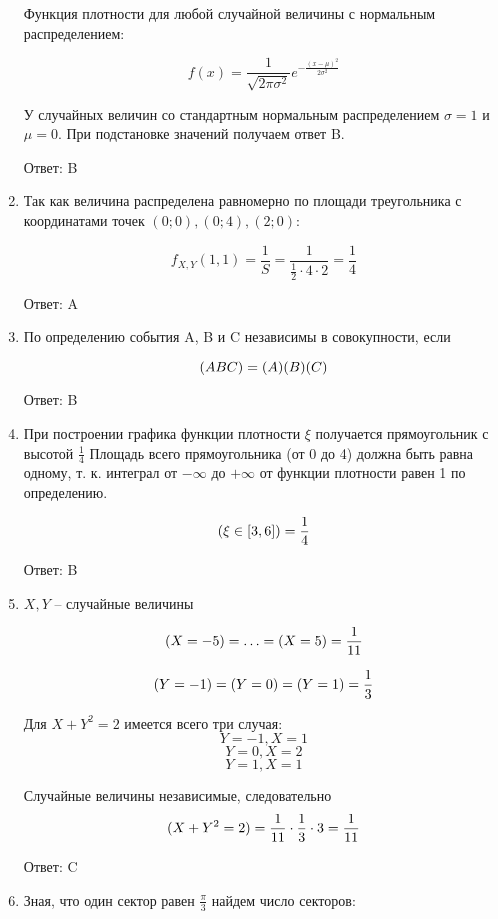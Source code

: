 \documentclass[a4paper]{article} %
\let\P\relax
\DeclareMathOperator{\P}{\mathbb{P}}
\begin{document}
\begin{enumerate}
    Функция плотности для любой случайной величины с нормальным распределением:
    
    \[ f(x)=\frac{1}{\sqrt{2\pi\sigma^2}} e^{-\frac{(x-\mu)^2}{2\sigma^2}} \]
    
    У случайных величин со стандартным нормальным распределением $\sigma=1$ и $\mu=0$. При подстановке значений получаем ответ B.

    Ответ: B

    \item

    Так как величина распределена равномерно по площади треугольника с координатами точек $(0;0), (0;4), (2;0)$:

    \[f_{X,Y}(1,1) = \frac{1}{S} = \frac{1}{\frac{1}{2}\cdot 4\cdot 2} = \frac{1}{4}\]

    Ответ: A

    \item
    
    По определению события A, B и C независимы в совокупности, если
    
    \[ \P(ABC) = \P(A)\P(B)\P(C) \]

    Ответ: B

    \item

    При построении графика функции плотности $\xi$ получается прямоугольник с высотой $\frac{1}{4}$
    Площадь всего прямоугольника (от 0 до 4) должна быть равна одному, т. к. интеграл от $-\infty$ до $+\infty$ от функции плотности равен 1 по определению.
    
    \[\P({\xi\in[3,6]}) = \frac{1}{4}\]

    Ответ: B

    \item

    $X, Y$ – случайные величины

    \[\P(X=-5) = \ldots = \P(X=5) = \frac{1}{11}\]

    \[\P(Y=-1) = \P(Y=0) = \P(Y=1) = \frac{1}{3}\]

    Для $X + Y^2 = 2$ имеется всего три случая:
    \[Y = -1, X = 1\]
    \[Y = 0, X = 2\]
    \[Y = 1, X = 1\]

    Случайные величины независимые, следовательно 
    \[\P(X + Y^2 = 2) = \frac{1}{11} \cdot\frac{1}{3} \cdot 3 = \frac{1}{11}\]

    Ответ: C

    \item
    
    Зная, что один сектор равен $\frac{\pi}{3}$ найдем число секторов:


\end{enumerate}
\end{document}
